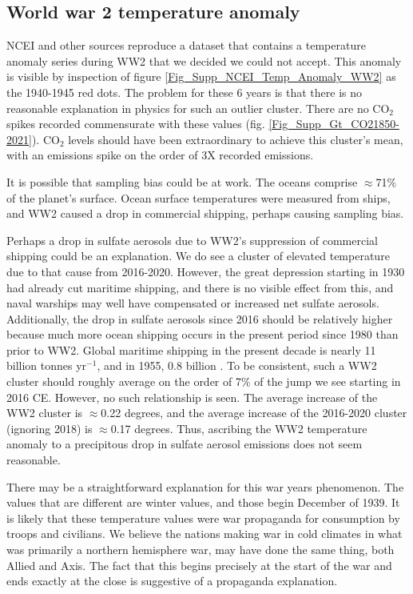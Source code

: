 \documentclass{article}
\begin{document}
\subsection{World war 2 temperature anomaly}
NCEI \cite{NCEI2022GlobalTempAnomalies} and other sources reproduce a dataset that contains a temperature anomaly series during WW2 that we decided we could not accept. This anomaly is visible by inspection of figure \ref{Fig_Supp_NCEI_Temp_Anomaly_WW2} as the 1940-1945 red dots. The problem for these 6 years is that there is no reasonable explanation in physics for such an outlier cluster. There are no CO$_2$ spikes recorded commensurate with these values (fig. \ref{Fig_Supp_Gt_CO21850-2021}). CO$_2$ levels should have been extraordinary to achieve this cluster's mean, with an emissions spike on the order of 3X recorded emissions. 

It is possible that sampling bias could be at work. The oceans comprise $\approx$71\% of the planet's surface. Ocean surface temperatures were measured from ships, and WW2 caused a drop in commercial shipping, perhaps causing sampling bias.

Perhaps a drop in sulfate aerosols \cite{Manshausen2022Invisibleshiptracks,Diamond2023CloudSulfurRegulation,Hansen2023WarmingInPipeline} due to WW2's suppression of commercial shipping could be an explanation. We do see a cluster of elevated temperature due to that cause from 2016-2020. However, the great depression starting in 1930 had already cut maritime shipping, and there is no visible effect from this, and naval warships may well have compensated or increased net sulfate aerosols. Additionally, the drop in sulfate aerosols since 2016 should be relatively higher because much more ocean shipping occurs in the present period since 1980 than prior to WW2. Global maritime shipping in the present decade is nearly 11 billion tonnes yr$^{-1}$, and in 1955, 0.8 billion \cite[p. 75]{UNCTAD2022HandbookStatsDevStatus} \cite[p. 3]{UNCTAD1968ReviewMaritimeTrans}. To be consistent, such a WW2 cluster should roughly average on the order of 7\% of the jump we see starting in 2016 CE. However, no such relationship is seen. The average increase of the WW2 cluster is $\approx$0.22 degrees, and the average increase of the 2016-2020 cluster (ignoring 2018) is $\approx$0.17 degrees. Thus, ascribing the WW2 temperature anomaly to a precipitous drop in sulfate aerosol emissions does not seem reasonable. 

There may be a straightforward explanation for this war years phenomenon. The values that are different are winter values, and those begin December of 1939. It is likely that these temperature values were war propaganda for consumption by troops and civilians. We believe the nations making war in cold climates in what was primarily a northern hemisphere war, may have done the same thing, both Allied and Axis. The fact that this begins precisely at the start of the war and ends exactly at the close is suggestive of a propaganda explanation. 
\end{document}
